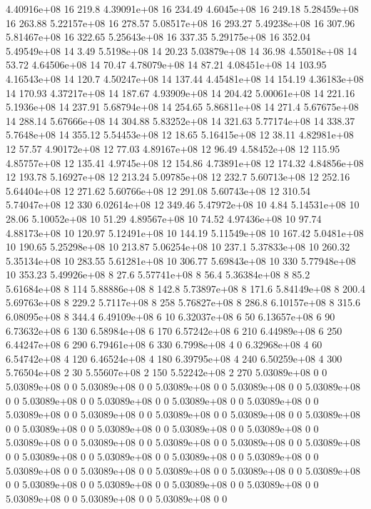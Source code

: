 4.40916e+08 16 219.8
4.39091e+08 16 234.49
4.6045e+08 16 249.18
5.28459e+08 16 263.88
5.22157e+08 16 278.57
5.08517e+08 16 293.27
5.49238e+08 16 307.96
5.81467e+08 16 322.65
5.25643e+08 16 337.35
5.29175e+08 16 352.04
5.49549e+08 14 3.49
5.5198e+08 14 20.23
5.03879e+08 14 36.98
4.55018e+08 14 53.72
4.64506e+08 14 70.47
4.78079e+08 14 87.21
4.08451e+08 14 103.95
4.16543e+08 14 120.7
4.50247e+08 14 137.44
4.45481e+08 14 154.19
4.36183e+08 14 170.93
4.37217e+08 14 187.67
4.93909e+08 14 204.42
5.00061e+08 14 221.16
5.1936e+08 14 237.91
5.68794e+08 14 254.65
5.86811e+08 14 271.4
5.67675e+08 14 288.14
5.67666e+08 14 304.88
5.83252e+08 14 321.63
5.77174e+08 14 338.37
5.7648e+08 14 355.12
5.54453e+08 12 18.65
5.16415e+08 12 38.11
4.82981e+08 12 57.57
4.90172e+08 12 77.03
4.89167e+08 12 96.49
4.58452e+08 12 115.95
4.85757e+08 12 135.41
4.9745e+08 12 154.86
4.73891e+08 12 174.32
4.84856e+08 12 193.78
5.16927e+08 12 213.24
5.09785e+08 12 232.7
5.60713e+08 12 252.16
5.64404e+08 12 271.62
5.60766e+08 12 291.08
5.60743e+08 12 310.54
5.74047e+08 12 330
6.02614e+08 12 349.46
5.47972e+08 10 4.84
5.14531e+08 10 28.06
5.10052e+08 10 51.29
4.89567e+08 10 74.52
4.97436e+08 10 97.74
4.88173e+08 10 120.97
5.12491e+08 10 144.19
5.11549e+08 10 167.42
5.0481e+08 10 190.65
5.25298e+08 10 213.87
5.06254e+08 10 237.1
5.37833e+08 10 260.32
5.35134e+08 10 283.55
5.61281e+08 10 306.77
5.69843e+08 10 330
5.77948e+08 10 353.23
5.49926e+08 8 27.6
5.57741e+08 8 56.4
5.36384e+08 8 85.2
5.61684e+08 8 114
5.88886e+08 8 142.8
5.73897e+08 8 171.6
5.84149e+08 8 200.4
5.69763e+08 8 229.2
5.7117e+08 8 258
5.76827e+08 8 286.8
6.10157e+08 8 315.6
6.08095e+08 8 344.4
6.49109e+08 6 10
6.32037e+08 6 50
6.13657e+08 6 90
6.73632e+08 6 130
6.58984e+08 6 170
6.57242e+08 6 210
6.44989e+08 6 250
6.44247e+08 6 290
6.79461e+08 6 330
6.7998e+08 4 0
6.32968e+08 4 60
6.54742e+08 4 120
6.46524e+08 4 180
6.39795e+08 4 240
6.50259e+08 4 300
5.76504e+08 2 30
5.55607e+08 2 150
5.52242e+08 2 270
5.03089e+08 0 0
5.03089e+08 0 0
5.03089e+08 0 0
5.03089e+08 0 0
5.03089e+08 0 0
5.03089e+08 0 0
5.03089e+08 0 0
5.03089e+08 0 0
5.03089e+08 0 0
5.03089e+08 0 0
5.03089e+08 0 0
5.03089e+08 0 0
5.03089e+08 0 0
5.03089e+08 0 0
5.03089e+08 0 0
5.03089e+08 0 0
5.03089e+08 0 0
5.03089e+08 0 0
5.03089e+08 0 0
5.03089e+08 0 0
5.03089e+08 0 0
5.03089e+08 0 0
5.03089e+08 0 0
5.03089e+08 0 0
5.03089e+08 0 0
5.03089e+08 0 0
5.03089e+08 0 0
5.03089e+08 0 0
5.03089e+08 0 0
5.03089e+08 0 0
5.03089e+08 0 0
5.03089e+08 0 0
5.03089e+08 0 0
5.03089e+08 0 0
5.03089e+08 0 0
5.03089e+08 0 0
5.03089e+08 0 0
5.03089e+08 0 0
5.03089e+08 0 0
5.03089e+08 0 0
